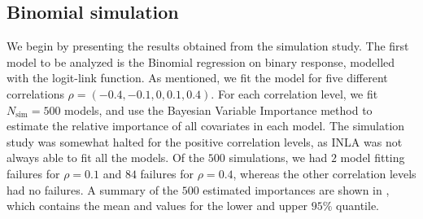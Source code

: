 \subsection{Binomial simulation}
We begin by presenting the results obtained from the simulation study. The first model to be analyzed is the Binomial regression on binary response, modelled with the logit-link function. As mentioned, we fit the model for five different correlations $\rho=(-0.4, -0.1, 0, 0.1, 0.4)$. For each correlation level, we fit $N_{\text{sim}}=500$ models, and use the Bayesian Variable Importance method to estimate the relative importance of all covariates in each model. The simulation study was somewhat halted for the positive correlation levels, as INLA was not always able to fit all the models. Of the $500$ simulations, we had $2$ model fitting failures for $\rho=0.1$ and $84$ failures for $\rho=0.4$, whereas the other correlation levels had no failures. A summary of the $500$ estimated importances are shown in , which contains the mean and values for the lower and upper $95\%$ quantile.
\\
\\ 

